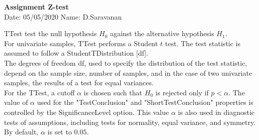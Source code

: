 \documentclass[a4paper,10pt,openright]{report}
\begin{document}
\singlespacing
\pagestyle{plain}

\begin{center}
\textbf{Assignment Z-test} \\
Date: 05/05/2020 \hspace{2mm} Name: D.Saravanan
\end{center}

\vspace{10px}

TTest test the null hypothesis $H_{0}$ against the alternative hypothesis $H_{1}$. \\

For univariate samples, TTest performs a Student $t$ test. The test statistic is assumed to
follow a StudentTDistribution [df]. \\ 

The degrees of freedom df, used to specify the distribution of the test statistic, depend on
the sample size, number of samples, and in the case of two univariate samples, the results 
of a test for equal variances. \\ 

For the TTest, a cutoff $\alpha$ is chosen such that $H_{0}$ is rejected only if $p < \alpha
$. The value of $\alpha$ used for the "TestConclusion" and "ShortTestConclusion" properties 
is controlled by the SignificanceLevel option. This value $\alpha$ is also used in diagnostic
tests of assumptions, including tests for normality, equal variance, and symmetry. By 
default, $\alpha$ is set to $0.05$. 
\end{document}
